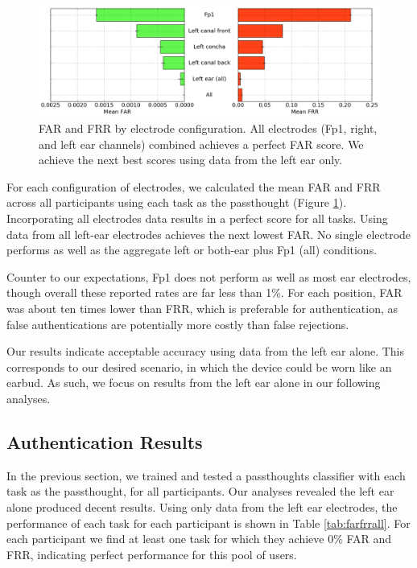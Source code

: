 \documentclass{sigchi}
\begin{document}
\begin{figure}[t]
\centering
\includegraphics[width=.9\linewidth]{./figures/mean-far-and-frr-by-electrode-config.png}
\caption{FAR and FRR by electrode configuration. All electrodes (Fp1, right, and left ear channels) combined achieves a perfect FAR score. We achieve the next best scores using data from the left ear only.}
\label{fig:meanByElectrode}
\end{figure}

For each configuration of electrodes, we calculated the mean FAR and FRR across all participants using each task as the passthought (Figure \ref{fig:meanByElectrode}). Incorporating all electrodes data results in a perfect score for all tasks. Using data from all left-ear electrodes achieves the next lowest FAR. No single electrode performs as well as the aggregate left or both-ear plus Fp1 (all) conditions. 

Counter to our expectations, Fp1 does not perform as well as most ear electrodes, though overall these reported rates are far less than 1\%. 
For each position, FAR was about ten times lower than FRR, which is preferable for authentication, as false authentications are potentially more costly than false rejections.

Our results indicate acceptable accuracy using data from the left ear alone. This corresponds to our desired scenario, in which the device could be worn like an earbud. As such, we focus on results from the left ear alone in our following analyses.

\subsection{Authentication Results}

In the previous section, we trained and tested a passthoughts classifier with each task as the passthought, for all participants. Our analyses revealed the left ear alone produced decent results. Using only data from the left ear electrodes, the performance of each task for each participant is shown in Table \ref{tab:farfrrall}. For each participant we find at least one task for which they achieve 0\% FAR and FRR, indicating perfect performance for this pool of users.
\end{document}
